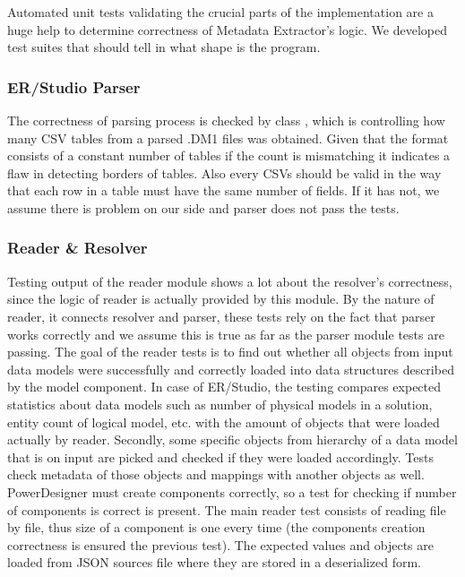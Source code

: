 Automated unit tests validating the crucial parts of the implementation are a huge help to determine correctness of Metadata Extractor's logic. 
We developed test suites that should tell in what shape is the program.

\subsubsection{ER/Studio Parser}

The correctness of parsing process is checked by class , which is controlling how many CSV tables from a parsed .DM1 files was obtained. Given that the format consists of a constant number of tables if the count is mismatching it indicates a flaw in detecting borders of tables.
Also every CSVs should be valid in the way that each row in a table must have the same number of fields. If it has not, we assume there is problem on our side and parser does not pass the tests.

\subsubsection{Reader \& Resolver}

Testing output of the reader module shows a lot about the resolver's correctness, since the logic of reader is actually provided by this module. 
By the nature of reader, it connects resolver and parser, these tests rely on the fact that parser works correctly and we assume this is true as far as the parser module tests are passing.
The goal of the reader tests is to find out whether all objects from input data models were successfully and correctly loaded into data structures described by the model component.
In case of ER/Studio, the testing compares expected statistics about data models such as number of physical models in a solution, entity count of logical model, etc. with the amount of objects that were loaded actually by reader.
Secondly, some specific objects from hierarchy of a data model that is on input are picked and checked if they were loaded accordingly. Tests check metadata of those objects and mappings with another objects as well. \\ 

PowerDesigner must create components correctly, so a test for checking if number of components is correct is present.
The main reader test consists of reading file by file, thus size of a component is one every time (the components creation correctness is ensured the previous test).
The expected values and objects are loaded from JSON sources file where they are stored in a deserialized form.

